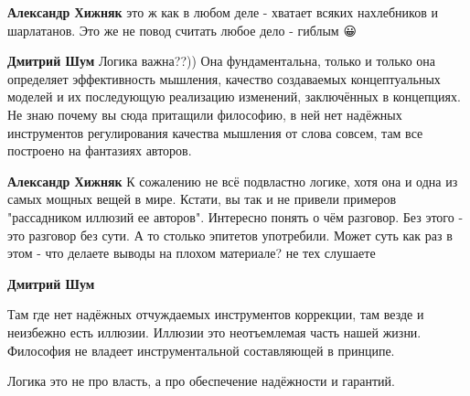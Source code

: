 \begin{itemize}
\begin{itemize}
 
\textbf{Александр Хижняк} это ж как в любом деле - хватает всяких нахлебников и
шарлатанов. Это же не повод считать любое дело - гиблым 😀

 
\textbf{Дмитрий Шум} Логика важна??)) Она фундаментальна, только и только она
определяет эффективность мышления, качество создаваемых концептуальных моделей
и их последующую реализацию изменений, заключённых в концепциях. Не знаю почему
вы сюда притащили философию, в ней нет надёжных инструментов регулирования
качества мышления от слова совсем, там все построено на фантазиях авторов.

 
\textbf{Александр Хижняк} К сожалению не всё подвластно логике, хотя она и одна
из самых мощных вещей в мире. Кстати, вы так и не привели примеров "рассадником
иллюзий ее авторов". Интересно понять о чём разговор. Без этого - это разговор
без сути. А то столько эпитетов употребили. Может суть как раз в этом - что
делаете выводы на плохом материале? не тех слушаете

 
\textbf{Дмитрий Шум} 

Там где нет надёжных отчуждаемых инструментов коррекции, там везде и неизбежно
есть иллюзии. Иллюзии это неотъемлемая часть нашей жизни. Философия не владеет
инструментальной составляющей в принципе.

Логика это не про власть, а про обеспечение надёжности и гарантий.


\end{itemize}
\end{itemize}
